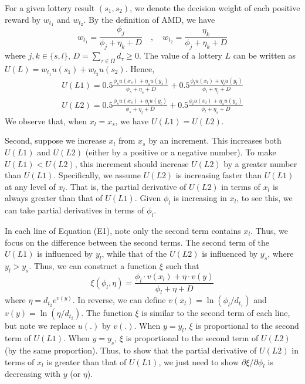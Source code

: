 \documentclass[
  12pt,
]{article}
\begin{document}
For a given lottery result \((s_1,s_2)\), we denote the decision weight
of each positive reward by \(w_{t_1}\) and \(w_{t_2}\). By the
definition of AMD, we have\[
w_{t_1} = \frac{\phi_j}{\phi_j + \eta_k +D} \quad ,\quad
w_{t_2} = \frac{\eta_k}{\phi_j + \eta_k +D}
\]where \(j,k\in\{s,l\}\), \(D=\sum_{\tau\in\Omega} d_{\tau}\geq 0\).
The value of a lottery \(L\) can be written as
\(U(L)=w_{t_1}u(s_1)+w_{t_2}u(s_2)\). Hence, \[\tag{E1}
\begin{aligned}
U(L1)=0.5\frac{\phi_s u(x_s)+\eta_s u(y_s)}{\phi_s+\eta_s+D} + 0.5\frac{\phi_l u(x_l)+\eta_l u(y_l)}{\phi_l+\eta_l+D} \\
U(L2)=0.5\frac{\phi_s u(x_s)+\eta_l u(y_l)}{\phi_s+\eta_l+D} + 0.5\frac{\phi_l u(x_l)+\eta_s u(y_s)}{\phi_l+\eta_s+D}
\end{aligned}
\]We observe that, when \(x_l=x_s\), we have \(U(L1)=U(L2)\).

Second, suppose we increase \(x_l\) from \(x_s\) by an increment. This
increases both \(U(L1)\) and \(U(L2)\) (either by a positive or a
negative number). To make \(U(L1)<U(L2)\), this increment should
increase \(U(L2)\) by a greater number than \(U(L1)\). Specifically, we
assume \(U(L2)\) is increasing faster than \(U(L1)\) at any level of
\(x_l\). That is, the partial derivative of \(U(L2)\) in terms of
\(x_l\) is always greater than that of \(U(L1)\). Given \(\phi_l\) is
increasing in \(x_l\), to see this, we can take partial derivatives in
terms of \(\phi_l\).

In each line of Equation (E1), note only the second term contains
\(x_l\). Thus, we focus on the difference between the second terms. The
second term of the \(U(L1)\) is influenced by \(y_l\), while that of the
\(U(L2)\) is influenced by \(y_s\), where \(y_l>y_s\). Thus, we can
construct a function \(\xi\) such that\[
\xi(\phi_l,\eta) = \frac{\phi_l \cdot v(x_l)+\eta\cdot v(y)}{\phi_l+\eta+D}
\]where \(\eta=d_{t_2}e^{v(y)}\). In reverse, we can define
\(v(x_l)=\ln(\phi_l/d_{t_1})\) and \(v(y)=\ln(\eta/d_{t_2})\). The
function \(\xi\) is similar to the second term of each line, but note we
replace \(u(.)\) by \(v(.)\). When \(y=y_l\), \(\xi\) is proportional to
the second term of \(U(L1)\). When \(y=y_s\), \(\xi\) is proportional to
the second term of \(U(L2)\) (by the same proportion). Thus, to show
that the partial derivative of \(U(L2)\) in terms of \(x_l\) is greater
than that of \(U(L1)\), we just need to show
\(\partial \xi/\partial \phi_l\) is decreasing with \(y\) (or \(\eta\)).
\end{document}

